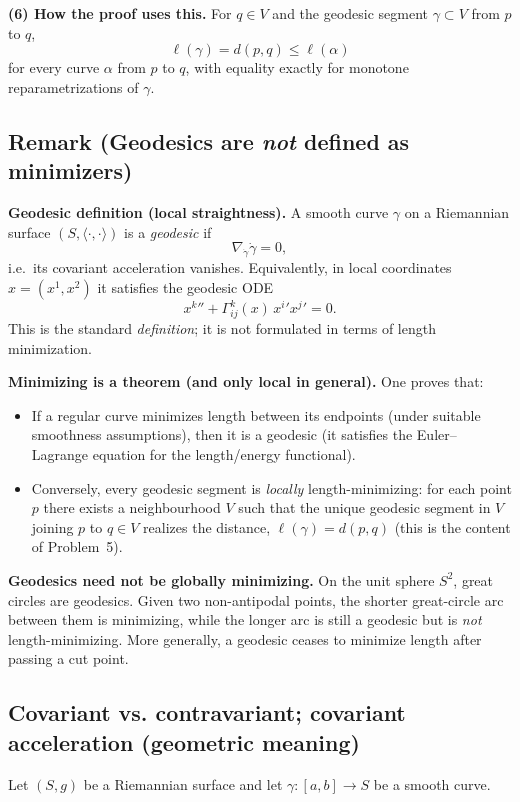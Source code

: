 \documentclass[12pt,a4paper]{article}
\theoremstyle{plain}
\theoremstyle{definition}      %
\begin{document}
\medskip
\textbf{(6) How the proof uses this.}
For $q\in V$ and the geodesic segment $\gamma\subset V$ from $p$ to $q$,
\[
\ell(\gamma)=d(p,q)\le \ell(\alpha)
\]
for every curve $\alpha$ from $p$ to $q$, with equality exactly for monotone reparametrizations of $\gamma$.

\subsection*{Remark (Geodesics are \emph{not} defined as minimizers)}

\textbf{Geodesic definition (local straightness).}
A smooth curve $\gamma$ on a Riemannian surface $(S,\langle\cdot,\cdot\rangle)$ is a \emph{geodesic} if
\[
\nabla_{\dot\gamma}\dot\gamma = 0,
\]
i.e.\ its covariant acceleration vanishes. Equivalently, in local coordinates $x=(x^1,x^2)$ it satisfies the
geodesic ODE
\[
x^{k}{}'' + \Gamma^{k}_{ij}(x)\,x^i{}'x^j{}' = 0.
\]
This is the standard \emph{definition}; it is not formulated in terms of length minimization.

\medskip
\textbf{Minimizing is a theorem (and only local in general).}
One proves that:
\begin{itemize}
	\item If a regular curve minimizes length between its endpoints (under suitable smoothness assumptions),
	then it is a geodesic (it satisfies the Euler--Lagrange equation for the length/energy functional).
	\item Conversely, every geodesic segment is \emph{locally} length-minimizing: for each point $p$ there exists
	a neighbourhood $V$ such that the unique geodesic segment in $V$ joining $p$ to $q\in V$ realizes the distance,
	$\ell(\gamma)=d(p,q)$ (this is the content of Problem~5).
\end{itemize}

\medskip
\textbf{Geodesics need not be globally minimizing.}
On the unit sphere $S^2$, great circles are geodesics. Given two non-antipodal points, the shorter great-circle
arc between them is minimizing, while the longer arc is still a geodesic but is \emph{not} length-minimizing.
More generally, a geodesic ceases to minimize length after passing a cut point.

\subsection*{Covariant vs. contravariant; covariant acceleration (geometric meaning)}

Let $(S,g)$ be a Riemannian surface and let $\gamma:[a,b]\to S$ be a smooth curve.
\end{document}
